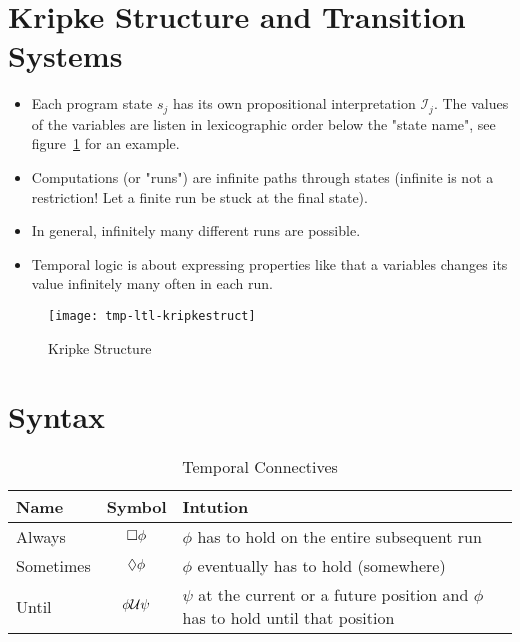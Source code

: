 	\section{Kripke Structure and Transition Systems}
		\begin{itemize}
			\item Each program state \(s_j\) has its own propositional interpretation \( \mathcal{I}_j \). The values of the variables are listen in lexicographic order below the "state name", see figure~\ref{fig:kripkeStruct} for an example.
			\item Computations (or "runs") are infinite paths through states (infinite is not a restriction! Let a finite run be stuck at the final state).
			\item In general, infinitely many different runs are possible.
			\item Temporal logic is about expressing properties like that a variables changes its value infinitely many often in each run.
		\end{itemize}
	
		\begin{figure}
			\centering
			\texttt{[image: tmp-ltl-kripkestruct]}
			\caption{Kripke Structure}
			\label{fig:kripkeStruct}
		\end{figure}

	\section{Syntax}
	
		\begin{table}
			\centering
			\begin{tabular}{l|c|l}
				\textbf{Name} &   \textbf{Symbol}    & \textbf{Intution}                                                                         \\ \hline
				Always        &   \(\square \phi\)   & \(\phi\) has to hold on the entire subsequent run                                         \\
				Sometimes     & \(\lozenge \phi\)  & \(\phi\) eventually has to hold (somewhere)                                               \\
				Until         & \(\phi \mathcal{U} \psi\) & \(\psi\) at the current or a future position and \(\phi\) has to hold until that position
			\end{tabular}
			\caption{Temporal Connectives}
			\label{tab:ltlConn}
		\end{table}

